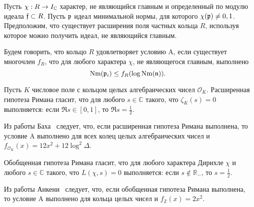 \documentclass[_00_dissertation.tex]{subfiles}
\begin{document}
\begin{definition}
    Пусть $\chi: R \to I_{\mathbb{C}}$ характер, не являющийся главным и определенный по модулю идеала $\mathfrak{f} \subset R$.
    Пусть $\mathfrak{p}$ идеал минимальной нормы, для которого $\chi(\mathfrak{p}) \neq 0, 1$.
    Предположим, что существует расширения поля частных кольца $R$, используя которое можно получить идеал, не являющийся главным.
    
    Будем говорить, что кольцо $R$ удовлетворяет условию A, если существует многочлен $f_R$, что для любого характера $\chi$, не являющегося главным, выполнено
    \begin{equation*}
        \textrm{Nm}(\mathfrak{p}_i) \le f_R(\log{\textrm{Nm}(\mathfrak{n})}).
    \end{equation*}
\end{definition}

\begin{remark}
    Пусть $K$ числовое поле с кольцом целых алгебраических чисел $\mathcal{O}_K$.
    Расширенная гипотеза Римана гласит, что для любого $s \in \mathbb{C}$ такого, что $\zeta_K(s) = 0$ выполняется: если $\Re{s} \in [0, 1]$, то $\Re{s} = \frac{1}{2}$.

    Из работы Баха~\cite{source:Bach} следует, что, если расширенная гипотеза Римана выполнена, то условие A выполнено для всех колец целых алгебраических чисел и $f_{\mathcal{O}_K}(x) = 12x^2 + 12\log^2 \Delta$.
\end{remark}

\begin{remark}
    Обобщенная гипотеза Римана гласит, что для любого характера Дирихле $\chi$ и любого $s \in \mathbb{C}$ такого, что $L(\chi, s) = 0$ выполняется: если $s \not\in \mathbb{R}_{-}$, то $s = \frac{1}{2}$.

    Из работы Анкени~\cite{source:Ankeny} следует, что, если обобщенная гипотеза Римана выполнена, то условие A выполнено для кольца целых чисел и $f_{\mathbb{Z}}(x) = 2x^2$.
\end{remark}
\end{document}
